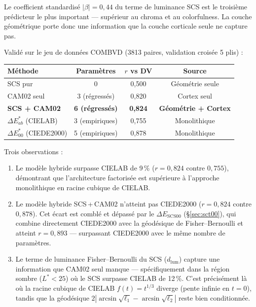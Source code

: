 \documentclass[12pt,a4paper]{article}
\begin{document}
Le coefficient standardis\'e $|\beta| = 0{,}44$ du terme de luminance
SCS est le troisi\`eme pr\'edicteur le plus important --- sup\'erieur au
chroma et au colorfulness. La couche g\'eom\'etrique porte donc une
information que la couche corticale seule ne capture pas.

Valid\'e sur le jeu de donn\'ees COMBVD (3813 paires, validation
crois\'ee 5 plis) :

\begin{center}
\begin{tabular}{lccc}
\toprule
M\'ethode & Param\`etres & $r$ vs DV & Source \\
\midrule
SCS pur & 0 & 0,500 & G\'eom\'etrie seule \\
CAM02 seul & 3 (r\'egress\'es) & 0,820 & Cortex seul \\
\textbf{SCS + CAM02} & \textbf{6 (r\'egress\'es)} & \textbf{0,824} & \textbf{G\'eom\'etrie + Cortex} \\
$\Delta E^*_{ab}$ (CIELAB) & 3 (empiriques) & 0,755 & Monolithique \\
$\Delta E^*_{00}$ (CIEDE2000) & 5 (empiriques) & 0,878 & Monolithique \\
\bottomrule
\end{tabular}
\end{center}

Trois observations :

\begin{enumerate}[nosep]
\item Le mod\`ele hybride surpasse CIELAB de 9\,\% ($r = 0{,}824$
  contre $0{,}755$), d\'emontrant que l'architecture factoris\'ee est
  sup\'erieure \`a l'approche monolithique en racine cubique de CIELAB.
\item Le mod\`ele hybride SCS\,+\,CAM02 n'atteint pas CIEDE2000
  ($r = 0{,}824$ contre $0{,}878$). Cet \'ecart est combl\'e et
  d\'epass\'e par le $\Delta E_{\mathrm{SCS00}}$ (\S\ref{sec:sct00}),
  qui combine directement CIEDE2000 avec la g\'eod\'esique de
  Fisher--Bernoulli et atteint $r = 0{,}893$ --- surpassant CIEDE2000
  avec le m\^eme nombre de param\`etres.
\item Le terme de luminance Fisher--Bernoulli du SCS
  ($d_{\mathrm{lum}}$) capture une information que CAM02 seul manque
  --- sp\'ecifiquement dans la r\'egion sombre ($L^* < 25$) o\`u le SCS
  surpasse CIELAB de 12\,\%. C'est pr\'ecis\'ement l\`a o\`u la racine
  cubique de CIELAB $f(t) = t^{1/3}$ diverge (pente infinie en
  $t = 0$), tandis que la g\'eod\'esique
  $2|\arcsin\sqrt{\ell_1} - \arcsin\sqrt{\ell_2}|$ reste bien
  conditionn\'ee.
\end{enumerate}
\end{document}
